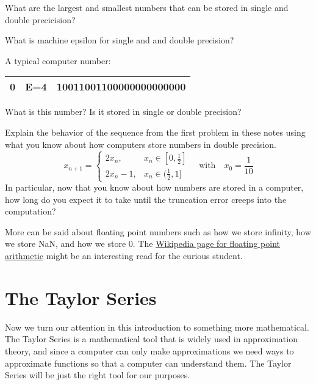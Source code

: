 \begin{problem}
    What are the largest and smallest numbers that can be stored in single and double
    precicision?
\end{problem}

\begin{problem}
    What is machine epsilon for single and and double precision?
\end{problem}



\begin{problem}
A typical computer number:
    \begin{center}
        \begin{tabular}{|c|c|c|}
            \hline
            0 & E=4 & 10011001100000000000000 \\ \hline
        \end{tabular}
    \end{center}
    What is this number?  Is it stored in single or double precision? 
\end{problem}


\begin{problem}
    Explain the behavior of the sequence from the first problem in these notes using what
    you know about how computers store numbers in double precision.
    \[ x_{n+1} = \left\{ \begin{array}{ll} 2x_n, & x_n \in [0,\frac{1}{2}] \\ 2x_n - 1, & x_n \in
        (\frac{1}{2},1] \end{array} \right. \quad \text{with} \quad x_0 = \frac{1}{10} \]
    In particular, now that you know about how numbers are stored in a computer, how long
    do you expect it to take until the truncation error creeps into the computation?
\end{problem}

More can be said about floating point numbers such as how we store infinity, how we store
NaN, and how we store 0.  The
\href{https://en.wikipedia.org/wiki/Floating-point_arithmetic}{Wikipedia page for floating
point arithmetic} might be an interesting read for the curious student.




\newpage\section{The Taylor Series}
Now we turn our attention in this introduction to something more mathematical.  The Taylor
Series is a mathematical tool that is widely used in approximation theory, and since a 
computer can only make approximations we need ways to approximate functions so that a
computer can understand them. The Taylor Series will be just the right tool for our
purposes.

